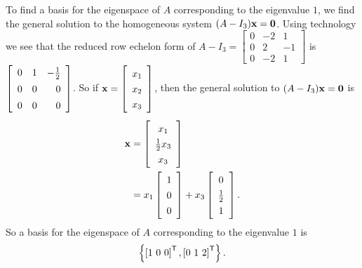 \begin{example}
To find a basis for the eigenspace of $A$ corresponding to the eigenvalue $1$, we find the general solution to the homogeneous system $(A - I_3)\mathbf{x} = \mathbf{0}$. Using technology we see that the reduced row echelon form of $A - I_3 =  \left[ \begin{array}{crr} 0&-2&1 \\ 0&2&-1 \\ 0&-2&1 \end{array} \right]$ is $\left[ \renewcommand{\arraystretch}{1.4} \begin{array}{ccr} 0&1&-\frac{1}{2} \\ 0&0&0 \\ 0&0&0 \end{array} \right]$. So if $\vx = \left[ \begin{array}{c} x_1 \\ x_2 \\ x_3 \end{array} \right]$, then the general solution to $(A-I_3)\mathbf{x} = \mathbf{0}$ is
\begin{align*}
\vx &= \left[ \renewcommand{\arraystretch}{1.3}  \begin{array}{c} x_1 \\ \frac{1}{2}x_3 \\ x_3 \end{array} \right]\\
	&= x_1 \left[\begin{array}{c}  1 \\ 0 \\ 0 \end{array} \right] + x_3 \left[ \renewcommand{\arraystretch}{1.3}  \begin{array}{c} 0 \\ \frac{1}{2} \\ 1 \end{array} \right].
\end{align*}
So a basis for the eigenspace of $A$ corresponding to the eigenvalue $1$ is 
\[\left\{ \left[ 1 \ 0 \ 0 \right]^{\mathsf{T}}, \left[  0 \ 1 \ 2 \right]^{\mathsf{T}} \right\}.\]


\end{example}
